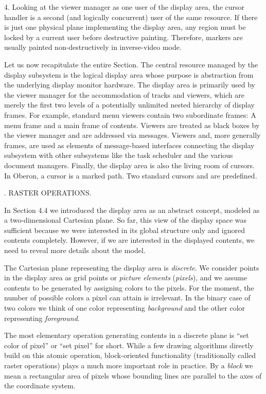 \item{4.} Looking at the viewer manager as one user of the display area, the cursor handler is a second (and logically concurrent) user of the same resource. If there is just one physical plane implementing the display area, any region must be locked by a current user before destructive painting. Therefore, markers are usually painted non-destructively in inverse-video mode.

\noindent Let us now recapitulate the entire Section. The central resource
managed by the display subsystem is the logical display area whose
purpose is abstraction from the underlying display monitor
hardware. The display area is primarily used by the viewer manager for
the accommodation of tracks and viewers, which are merely the first
two levels of a potentially unlimited nested hierarchy of display
frames. For example, standard menu viewers contain two subordinate
frames: A menu frame and a main frame of contents. Viewers are treated
as black boxes by the viewer manager and are addressed via
messages. Viewers and, more generally frames, are used as elements of
message-based interfaces connecting the display subsystem with other
subsystems like the task scheduler and the various document
managers. Finally, the display area is also the living room of
cursors. In Oberon, a cursor is a marked path. Two standard cursors
 and  are predefined.

. RASTER OPERATIONS.

In Section 4.4 we introduced the display area as an abstract concept,
modeled as a two-dimensional Cartesian plane. So far, this view of
the display space was sufficient because we were interested in its
global structure only and ignored contents completely. However, if we
are interested in the displayed contents, we need to reveal more
details about the model.

The Cartesian plane representing the display area is \emph{discrete}. We
consider points in the display area as grid points or \emph{picture elements}
(\emph{pixels}), and we assume contents to be generated by assigning colors
to the pixels. For the moment, the number of possible colors a pixel
can attain is irrelevant. In the binary case of two colors we think of
one color representing \emph{background} and the other color representing
\emph{foreground}.

The most elementary operation generating contents in a discrete plane
is ``set color of pixel'' or ``set pixel'' for short. While a few drawing
algorithms directly build on this atomic operation, block-oriented
functionality (traditionally called raster operations) plays a much
more important role in practice. By a \emph{block} we mean a rectangular area
of pixels whose bounding lines are parallel to the axes of the
coordinate system.

